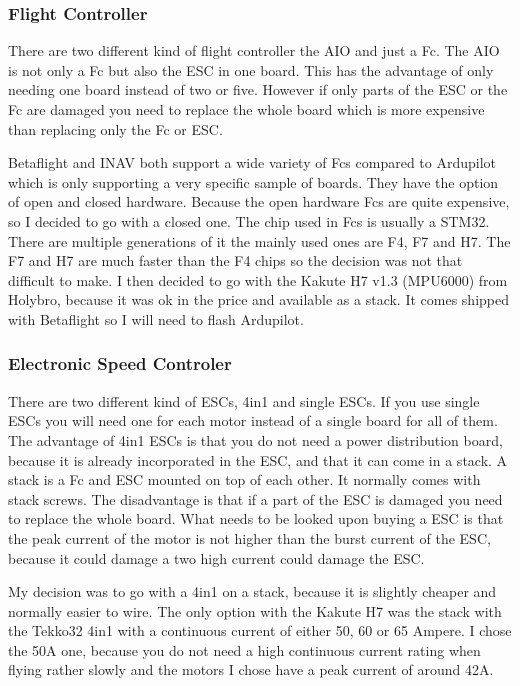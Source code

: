 \documentclass{article}
\begin{document}
	\subsubsection[Fc]{Flight Controller}
	There are two different kind of flight controller the \gls{AIO} and just a \gls{Fc}. The \gls{AIO} is not only a \gls{Fc} but also the \gls{ESC} in one board. This has the advantage of only needing one board instead of two or five. However if only parts of the \gls{ESC} or the \gls{Fc} are damaged you need to replace the whole board which is more expensive than replacing only the \gls{Fc} or \gls{ESC}. 
	
	Betaflight and INAV both support a wide variety of \gls{Fc}s compared to Ardupilot which is only supporting a very specific sample of boards\cite{FcSupport}. They have the option of open and closed hardware. Because the open hardware \gls{Fc}s are quite expensive, so I decided to go with a closed one. The chip used in \gls{Fc}s is usually a STM32. There are multiple generations of it the mainly used ones are F4, F7 and H7. The F7 and H7 are much faster than the F4 chips so the decision was not that difficult to make. I then decided to go with the Kakute H7 v1.3 (MPU6000)\cite{KakuteH7} from Holybro, because it was ok in the price and available as a stack. It comes shipped with Betaflight so I will need to flash Ardupilot. 




	\subsubsection[ESC]{Electronic Speed Controler}
	There are two different kind of \gls{ESC}s, 4in1 and single \gls{ESC}s. If you use single \gls{ESC}s you will need one for each motor instead of a single board for all of them. The advantage of 4in1 \gls{ESC}s is that you do not need a power distribution board, because it is already incorporated in the \gls{ESC}, and that it can come in a stack. A stack is a \gls{Fc} and \gls{ESC} mounted on top of each other. It normally comes with stack screws. The disadvantage is that if a part of the \gls{ESC} is damaged you need to replace the whole board. What needs to be looked upon buying a \gls{ESC} is that the peak current of the motor is not higher than the burst current of the \gls{ESC}, because it could damage a two high current could damage the \gls{ESC}.
	
	My decision was to go with a 4in1 on a stack, because it is slightly cheaper and normally easier to wire. The only option with the Kakute H7 was the stack with the Tekko32 4in1 with a continuous current of either 50, 60 or 65 Ampere. I chose the 50A\cite{Tekko32} one, because you do not need a high continuous current rating when flying rather slowly and the motors I chose have a peak current of around 42A. 
	
\end{document}
